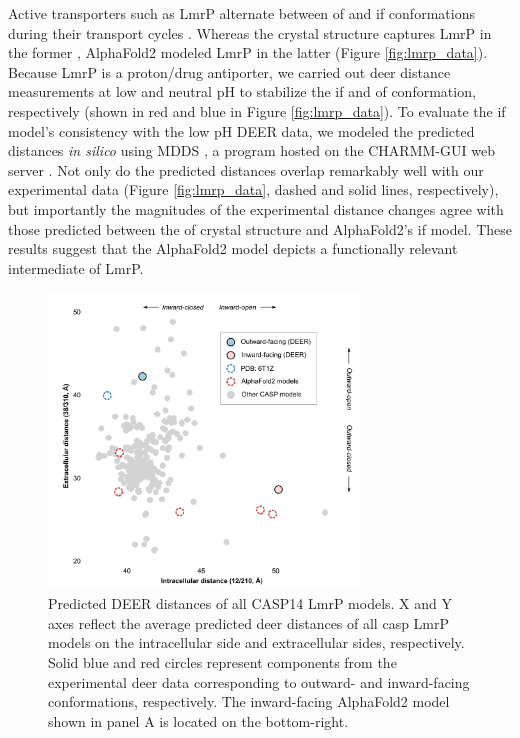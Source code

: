 Active transporters such as LmrP alternate between \gls{of} and \gls{if} conformations during their transport cycles \citep*{Boudker2010, Masureel2014, Martens2016}. Whereas the crystal structure captures LmrP in the former \citep*{Debruycker2020}, AlphaFold2 modeled LmrP in the latter \citep*{Jumper2020} (Figure \ref{fig:lmrp_data}). Because LmrP is a proton/drug antiporter, we carried out \gls{deer} distance measurements \citep*{Jeschke2012, Dastvan2019, Mchaourab2011} at low and neutral pH to stabilize the \gls{if} and \gls{of} conformation, respectively (shown in red and blue in Figure \ref{fig:lmrp_data}). To evaluate the \gls{if} model's consistency with the low pH DEER data, we modeled the predicted distances \emph{in silico} using MDDS \citep*{Islam2013}, a program hosted on the CHARMM-GUI web server \citep*{Jo2014}. Not only do the predicted distances overlap remarkably well with our experimental data (Figure \ref{fig:lmrp_data}, dashed and solid lines, respectively), but importantly the magnitudes of the experimental distance changes agree with those predicted between the \gls{of} crystal structure and AlphaFold2's \gls{if} model. These results suggest that the AlphaFold2 model depicts a functionally relevant intermediate of LmrP.


\begin{figure}
\centering
\includegraphics[width=3.25in]{Figures/lmrp_caspmodels.pdf}
 \caption[Predicted DEER distances of all CASP14 LmrP models.]{Predicted DEER distances of all CASP14 LmrP models. X and Y axes reflect the average predicted \gls{deer} distances of all \gls{casp} LmrP models on the intracellular side and extracellular sides, respectively. Solid blue and red circles represent components from the experimental \gls{deer} data corresponding to outward- and inward-facing conformations, respectively. The inward-facing AlphaFold2 model shown in panel A is located on the bottom-right.}
\label{fig:lmrp_caspmodels}
\end{figure}

